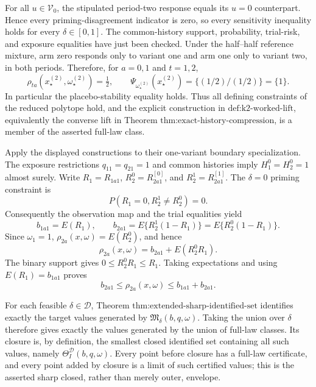 For all \(u\in\mathcal V_0\), the stipulated period-two response equals its \(u=0\) counterpart.  Hence every priming-disagreement indicator is zero, so every sensitivity inequality holds for every \(\delta\in[0,1]\).  The common-history support, probability, trial-risk, and exposure equalities have just been checked.  Under the half--half reference mixture, arm zero responds only to variant one and arm one only to variant two, in both periods.  Therefore, for \(a=0,1\) and \(t=1,2\),
\[
\rho_{ta}(x_\star^{(2)},\omega_\star^{(2)})=\tfrac12,
\qquad
\Psi_{\omega_\star^{(2)}}(x_\star^{(2)})=\{(1/2)/(1/2)\}=\{1\}.
\]
In particular the placebo-stability equality holds.  Thus all defining constraints of the reduced polytope hold, and the explicit construction in \(\text{def:k2-worked-lift}\), equivalently the converse lift in Theorem \(\text{thm:exact-history-compression}\), is a member of the asserted full-law class.

Apply the displayed constructions to their one-variant boundary specialization.  The exposure restrictions \(q_{11}=q_{21}=1\) and common histories imply \(H_1^0=H_2^0=1\) almost surely.  Write \(R_1=R_{1a1}\), \(R_2^0=R^{[0]}_{2a1}\), and \(R_2^1=R^{[1]}_{2a1}\).  The \(\delta=0\) priming constraint is
\[
P(R_1=0,R_2^1\ne R_2^0)=0.
\]
Consequently the observation map and the trial equalities yield
\[
b_{1a1}=E(R_1),
\qquad
b_{2a1}=E\{R_2^1(1-R_1)\}=E\{R_2^0(1-R_1)\}.
\]
Since \(\omega_1=1\), \(\rho_{2a}(x,\omega)=E(R_2^0)\), and hence
\[
\rho_{2a}(x,\omega)
=b_{2a1}+E(R_2^0R_1).
\]
The binary support gives \(0\leq R_2^0R_1\leq R_1\).  Taking expectations and using \(E(R_1)=b_{1a1}\) proves
\[
b_{2a1}\leq\rho_{2a}(x,\omega)\leq b_{1a1}+b_{2a1}.
\]

For each feasible \(\delta\in\mathcal D\), Theorem \(\text{thm:extended-sharp-identified-set}\) identifies exactly the target values generated by \(\mathfrak M_\delta(b,q,\omega)\).  Taking the union over \(\delta\) therefore gives exactly the values generated by the union of full-law classes.  Its closure is, by definition, the smallest closed identified set containing all such values, namely \(\Theta_I^{\mathcal D}(b,q,\omega)\).  Every point before closure has a full-law certificate, and every point added by closure is a limit of such certified values; this is the asserted sharp closed, rather than merely outer, envelope.

